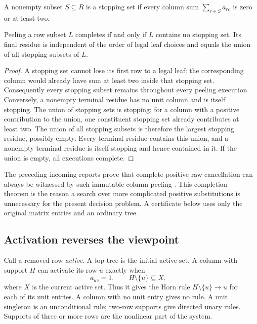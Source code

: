 \begin{definition}
A nonempty subset $S\subseteq R$ is a stopping set if every column sum
$\sum_{r\in S}a_{rc}$ is zero or at least two.
\end{definition}

\begin{proposition}
\label{prop:stopping}
Peeling a row subset $L$ completes if and only if $L$ contains no stopping
set. Its final residue is independent of the order of legal leaf choices
and equals the union of all stopping subsets of $L$.
\end{proposition}
\begin{proof}
A stopping set cannot lose its first row to a legal leaf: the corresponding
column would already have sum at least two inside that stopping set.
Consequently every stopping subset remains throughout every peeling
execution. Conversely, a nonempty terminal residue has no unit column and
is itself stopping. The union of stopping sets is stopping: for a column
with a positive contribution to the union, one constituent stopping set
already contributes at least two. The union of all stopping subsets is therefore the largest stopping
residue, possibly empty. Every terminal residue contains this union, and a
nonempty terminal residue is itself stopping and hence contained in it.
If the union is empty, all executions complete.
\end{proof}

The preceding incoming reports prove that complete positive raw
cancellation can always be witnessed by such immutable column peeling
\cite{repo-positive,repo-dual-normalization}. This completion theorem is
the reason a search over more complicated positive substitutions is
unnecessary for the present decision problem. A certificate below uses
only the original matrix entries and an ordinary tree.

\subsection{Activation reverses the viewpoint}

Call a removed row \emph{active}. A top tree is the initial active set.
A column with support $H$ can activate its row $u$ exactly when
\[
               a_{uc}=1,\qquad H\setminus\{u\}\subseteq X,
\]
where $X$ is the current active set. Thus it gives the Horn rule
$H\setminus\{u\}\to u$ for each of its unit entries. A column with no
unit entry gives no rule. A unit singleton is an unconditional rule;
two-row supports give directed unary rules. Supports of three or more
rows are the nonlinear part of the system.

